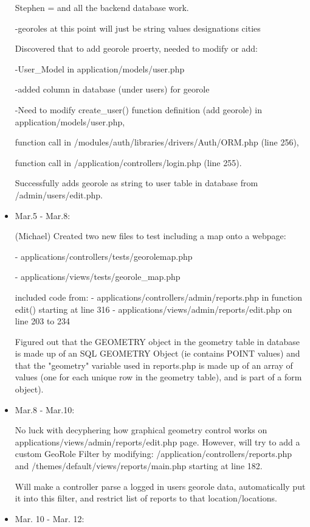 \documentclass{article}
\begin{document}
\begin{itemize}
Stephen = and all the backend database work.

-georoles at this point will just be string values designations cities

Discovered that to add georole proerty, needed to modify or add:

-User\_Model in application/models/user.php

-added column in database (under users) for georole

-Need to modify create\_user() 
function definition (add georole) in application/models/user.php,

function call in /modules/auth/libraries/drivers/Auth/ORM.php (line 256),

function call in /application/controllers/login.php (line 255).
    
Successfully adds georole as string to user table in database from /admin/users/edit.php.

\item Mar.5 - Mar.8:
    
(Michael) Created two new files to test including a map onto a webpage:

- applications/controllers/tests/georolemap.php

- applications/views/tests/georole\_map.php
        
included code from:
- applications/controllers/admin/reports.php in function edit() starting at line 316
- applications/views/admin/reports/edit.php on line 203 to 234
        
Figured out that the GEOMETRY object in the geometry table in database is made up of an SQL GEOMETRY Object (ie contains POINT values) and that the "geometry" variable used in reports.php is made up of an array of values (one for each unique row in the geometry table), and is part of a form object).

\item Mar.8 - Mar.10:

No luck with decyphering how graphical geometry control works on applications/views/admin/reports/edit.php page. However, will try to add a custom GeoRole Filter by modifying: /application/controllers/reports.php and /themes/default/views/reports/main.php starting at line 182.

Will make a controller parse a logged in users georole data, automatically put it into this filter, and restrict list of reports to that location/locations.

\item Mar. 10 - Mar. 12:


\end{itemize}
\end{document}
